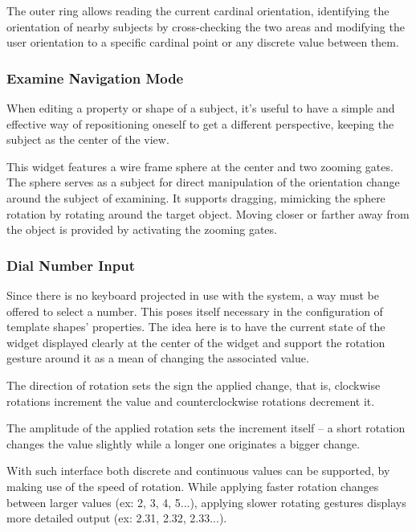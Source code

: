 The outer ring allows reading the current cardinal orientation,
identifying the orientation of nearby subjects by cross-checking the two areas and
modifying the user orientation to a specific cardinal point or any discrete value between them.


\subsubsection{Examine Navigation Mode}
\label{sec:examine}

When editing a property or shape of a subject, it's useful to have a simple and effective way
of repositioning oneself to get a different perspective, keeping the subject as the center of the view.


This widget features a wire frame sphere at the center and two zooming gates.
The sphere serves as a subject for direct manipulation of the orientation change around the subject of examining.
It supports dragging, mimicking the sphere rotation by rotating around the target object.
Moving closer or farther away from the object is provided by activating the zooming gates.


\subsubsection{Dial Number Input}

Since there is no keyboard projected in use with the system, a way must be offered to select a number.
This poses itself necessary in the configuration of template shapes' properties.
The idea here is to have the current state of the widget displayed clearly at the center of the widget
and support the rotation gesture around it as a mean of changing the associated value.


The direction of rotation sets the sign the applied change, that is, clockwise rotations increment
the value and counterclockwise rotations decrement it.

The amplitude of the applied rotation sets the increment itself -- a short rotation changes the value
slightly while a longer one originates a bigger change.

With such interface both discrete and continuous values can be supported, by making use of the speed of rotation.
While applying faster rotation changes between larger values (ex: 2, 3, 4, 5...), applying slower rotating
gestures displays more detailed output (ex: 2.31, 2.32, 2.33...).

